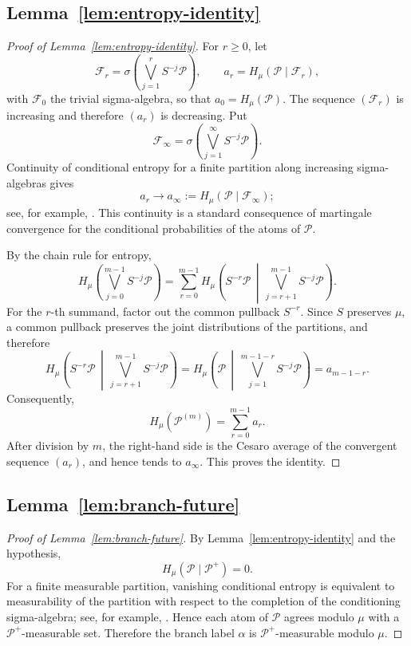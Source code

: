 \documentclass[11pt]{amsart}
\theoremstyle{plain}
\theoremstyle{definition}
\theoremstyle{remark}
\newcommand{\cP}{\mathcal P}
\begin{document}
\subsection{Lemma~\ref{lem:entropy-identity}}\label{app:lem-entropy-identity}

\begin{proof}[Proof of Lemma~\ref{lem:entropy-identity}]
For \(r\geq0\), let
\[
        \mathcal F_r
        =
        \sigma\left(\bigvee_{j=1}^{r}S^{-j}\cP\right),
        \qquad
        a_r=H_\mu(\cP\mid\mathcal F_r),
\]
with \(\mathcal F_0\) the trivial sigma-algebra, so that \(a_0=H_\mu(\cP)\). The
sequence \((\mathcal F_r)\) is increasing and therefore \((a_r)\) is decreasing. Put
\[
        \mathcal F_\infty
        =
        \sigma\left(\bigvee_{j=1}^{\infty}S^{-j}\cP\right).
\]
Continuity of conditional entropy for a finite partition along increasing sigma-algebras
gives
\[
        a_r\longrightarrow
        a_\infty:=H_\mu(\cP\mid\mathcal F_\infty);
\]
see, for example, \cite[Section~4.3]{Walters}. This continuity is a standard consequence of
martingale convergence for the conditional probabilities of the atoms of \(\cP\).

By the chain rule for entropy,
\[
H_\mu\left(\bigvee_{j=0}^{m-1}S^{-j}\cP\right)
=
\sum_{r=0}^{m-1}
H_\mu\left(S^{-r}\cP\,\middle|\,\bigvee_{j=r+1}^{m-1}S^{-j}\cP\right).
\]
For the \(r\)-th summand, factor out the common pullback \(S^{-r}\). Since \(S\)
preserves \(\mu\), a common pullback preserves the joint distributions of the partitions,
and therefore
\[
H_\mu\left(S^{-r}\cP\,\middle|\,\bigvee_{j=r+1}^{m-1}S^{-j}\cP\right)
=
H_\mu\left(\cP\,\middle|\,\bigvee_{j=1}^{m-1-r}S^{-j}\cP\right)
=a_{m-1-r}.
\]
Consequently,
\[
        H_\mu(\cP^{(m)})=\sum_{r=0}^{m-1}a_r.
\]
After division by \(m\), the right-hand side is the Cesaro average of the convergent
sequence \((a_r)\), and hence tends to \(a_\infty\). This proves the identity.
\end{proof}

\subsection{Lemma~\ref{lem:branch-future}}\label{app:lem-branch-future}

\begin{proof}[Proof of Lemma~\ref{lem:branch-future}]
By Lemma~\ref{lem:entropy-identity} and the hypothesis,
\[
        H_\mu(\cP\mid\cP^+)=0.
\]
For a finite measurable partition, vanishing conditional entropy is equivalent to
measurability of the partition with respect to the completion of the conditioning
sigma-algebra; see, for example, \cite[Section~4.3]{Walters}. Hence each atom of \(\cP\)
agrees modulo \(\mu\) with a \(\cP^+\)-measurable set. Therefore the branch label
\(\alpha\) is \(\cP^+\)-measurable modulo \(\mu\).
\end{proof}
\end{document}
